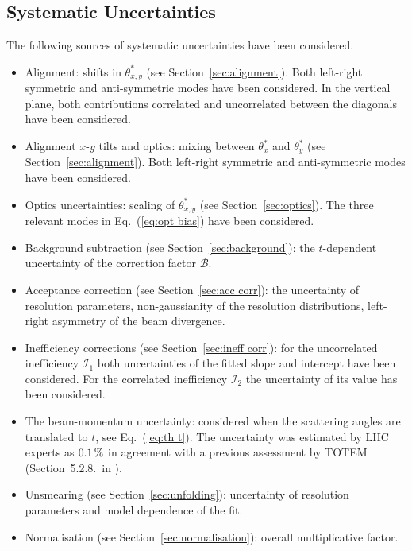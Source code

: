 
\subsection{Systematic Uncertainties}
\label{sec:systematics}

The following sources of systematic uncertainties have been considered.
\begin{itemize}[noitemsep,topsep=0pt]

\item Alignment: shifts in $\theta^*_{x,y}$ (see Section~\ref{sec:alignment}). Both left-right symmetric and anti-symmetric modes have been considered. In the vertical plane, both contributions correlated and uncorrelated between the diagonals have been considered.

\item Alignment $x$-$y$ tilts and optics: mixing between $\theta^*_{x}$ and $\theta^*_{y}$ (see Section~\ref{sec:alignment}). Both left-right symmetric and anti-symmetric modes have been considered.

\item Optics uncertainties: scaling of $\theta^*_{x,y}$ (see Section~\ref{sec:optics}). The three relevant modes in Eq.~(\ref{eq:opt bias}) have been considered.

\item Background subtraction (see Section~\ref{sec:background}): the $t$-dependent uncertainty of the correction factor $\mathcal{B}$.

\item Acceptance correction (see Section~\ref{sec:acc corr}): the uncertainty of resolution parameters, non-gaussianity of the resolution distributions, left-right asymmetry of the beam divergence.

\item Inefficiency corrections (see Section~\ref{sec:ineff corr}): for the uncorrelated inefficiency $\mathcal{I}_1$ both uncertainties of the fitted slope and intercept have been considered. For the correlated inefficiency $\mathcal{I}_2$ the uncertainty of its value has been considered.

\item The beam-momentum uncertainty: considered when the scattering angles are translated to $t$, see Eq.~(\ref{eq:th t}). The uncertainty was estimated by LHC experts as $0.1\,{\rm \%}$ \cite{beam-mom-unc} in agreement with a previous assessment by TOTEM (Section~5.2.8.~in \cite{totem-8tev-90m}).

\item Unsmearing (see Section~\ref{sec:unfolding}): uncertainty of resolution parameters and model dependence of the fit.

\item Normalisation (see Section~\ref{sec:normalisation}): overall multiplicative factor.

\end{itemize}

